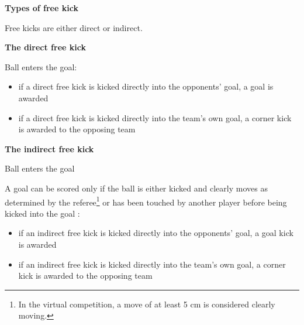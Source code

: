 \clearpage
\sffamily
{\bfseries\color[rgb]{0.4,0.4,0.4}{Law 13 -- Free Kicks} }
{}

\bigskip

{\bfseries Types of free kick}

\headlinebox

Free kicks are either direct or indirect.

\bigskip

{\bfseries The direct free kick }

\headlinebox

Ball enters the goal:

\begin{itemize}
\item if a direct free kick is kicked directly into the
opponents{\textquoteright} goal, a goal is awarded
\item if a direct free kick is kicked directly into the team's own goal, a corner kick is awarded to the opposing team
\end{itemize}

\bigskip

{\bfseries The indirect free kick}

\headlinebox



\bigskip

Ball enters the goal

A goal can be scored only if the ball is either kicked and clearly moves as
determined by the referee\footnote{In the virtual competition, a move of at least 5 cm is considered clearly moving.} or has been touched by another player before being
kicked into the goal
:

\begin{itemize}
\item if an indirect free kick is kicked directly into the
opponents' goal, a goal kick is awarded
\item if an indirect free kick is kicked directly into the
team's own goal, a corner kick is awarded to the
opposing team
\end{itemize}

